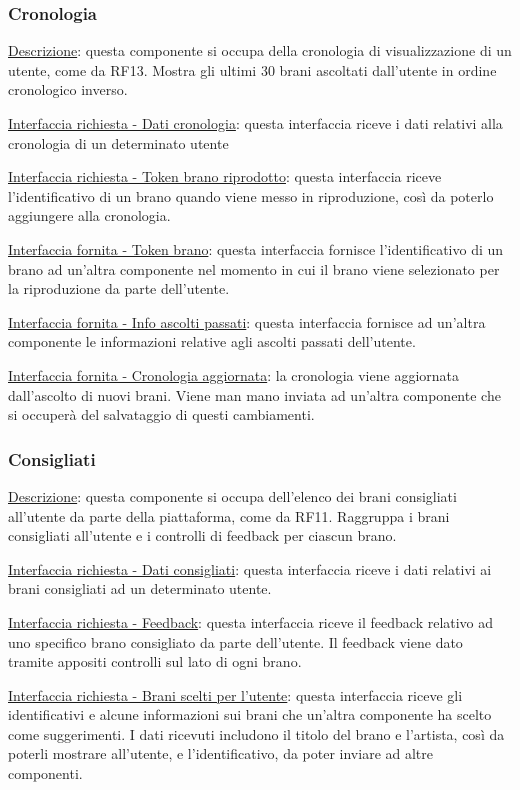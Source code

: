 \documentclass[a4paper,12pt]{article}
\begin{document}
\subsubsection{Cronologia}

\underline{Descrizione}: questa componente si occupa della cronologia di visualizzazione di un utente, come da RF13. Mostra gli ultimi 30 brani ascoltati dall’utente in ordine cronologico inverso.

\underline{Interfaccia richiesta - Dati cronologia}: questa interfaccia riceve i dati relativi alla cronologia di un determinato utente

\underline{Interfaccia richiesta - Token brano riprodotto}: questa interfaccia riceve l’identificativo di un brano quando viene messo in riproduzione, così da poterlo aggiungere alla cronologia.

\underline{Interfaccia fornita - Token brano}: questa interfaccia fornisce l’identificativo di un brano ad un’altra componente nel momento in cui il brano viene selezionato per la riproduzione da parte dell’utente.

\underline{Interfaccia fornita - Info ascolti passati}: questa interfaccia fornisce ad un’altra componente le informazioni relative agli ascolti passati dell’utente.

\underline{Interfaccia fornita - Cronologia aggiornata}: la cronologia viene aggiornata dall’ascolto di nuovi brani. Viene man mano inviata ad un’altra componente che si occuperà del salvataggio di questi cambiamenti.

\subsubsection{Consigliati}

\underline{Descrizione}: questa componente si occupa dell’elenco dei brani consigliati all’utente da parte della piattaforma, come da RF11. Raggruppa i brani consigliati all’utente e i controlli di feedback per ciascun brano.

\underline{Interfaccia richiesta - Dati consigliati}: questa interfaccia riceve i dati relativi ai brani consigliati ad un determinato utente.

\underline{Interfaccia richiesta - Feedback}: questa interfaccia riceve il feedback relativo ad uno specifico brano consigliato da parte dell’utente. Il feedback viene dato tramite appositi controlli sul lato di ogni brano.

\underline{Interfaccia richiesta - Brani scelti per l’utente}: questa interfaccia riceve gli identificativi e alcune informazioni sui brani che un’altra componente ha scelto come suggerimenti. I dati ricevuti includono il titolo del brano e l’artista, così da poterli mostrare all’utente, e l’identificativo, da poter inviare ad altre componenti.
\end{document}
